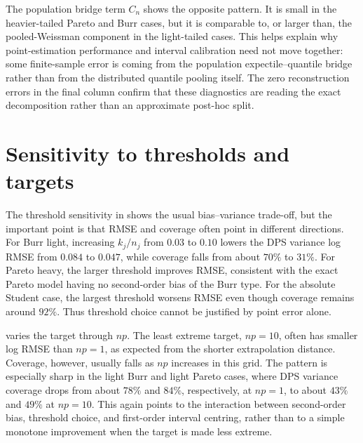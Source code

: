 The population bridge term \(C_n\) shows the opposite pattern. It is small in
the heavier-tailed Pareto and Burr cases, but it is comparable to, or larger
than, the pooled-Weissman component in the light-tailed cases. This helps
explain why point-estimation performance and interval calibration need not
move together: some finite-sample error is coming from the population
expectile--quantile bridge rather than from the distributed quantile pooling
itself. The zero reconstruction errors in the final column confirm that these
diagnostics are reading the exact decomposition rather than an approximate
post-hoc split.

\begin{table}[htbp]
\centering
\small
\caption{Finite-sample decomposition ledger in the representative main design.
The estimator uses DPS variance pooled-Weissman weights and
\(\bm\nu=\bm\nu_n^k\).}
\label{tab:sim:decomposition}
\begingroup
\setlength{\tabcolsep}{4pt}

\endgroup
\end{table}

\section{Sensitivity to thresholds and targets}
\label{sec:sim:sensitivity}

The threshold sensitivity in  shows the usual
bias--variance trade-off, but the important point is that RMSE and coverage
often point in different directions. For Burr light, increasing \(k_j/n_j\)
from \(0.03\) to \(0.10\) lowers the DPS variance log RMSE from \(0.084\) to
\(0.047\), while coverage falls from about \(70\%\) to \(31\%\). For Pareto
heavy, the larger threshold improves RMSE, consistent with the exact Pareto
model having no second-order bias of the Burr type. For the absolute Student
case, the largest threshold worsens RMSE even though coverage remains around
\(92\%\). Thus threshold choice cannot be justified by point error alone.

 varies the target through \(np\). The least extreme
target, \(np=10\), often has smaller log RMSE than \(np=1\), as expected from
the shorter extrapolation distance. Coverage, however, usually falls as
\(np\) increases in this grid. The pattern is especially sharp in the light
Burr and light Pareto cases, where DPS variance coverage drops from about
\(78\%\) and \(84\%\), respectively, at \(np=1\), to about \(43\%\) and
\(49\%\) at \(np=10\). This again points to the interaction between
second-order bias, threshold choice, and first-order interval centring, rather
than to a simple monotone improvement when the target is made less extreme.

